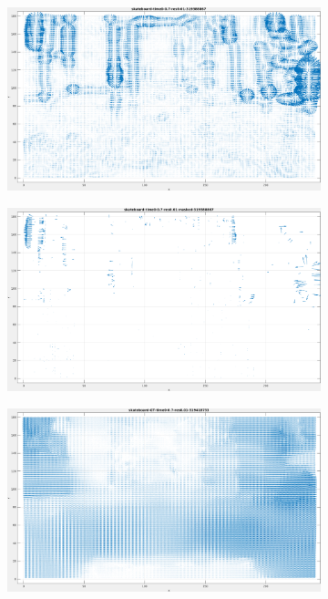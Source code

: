 \begin{figure}[tb]
\centering
\begin{subfigure}{.45\textwidth}
  \centering
  \includegraphics[height=.6\linewidth]{figs/skateboard/skateboard-1.png}
  \caption{}
  \label{fig:skateboard-snapshots1}
\end{subfigure}
\begin{subfigure}{.45\textwidth}
  \includegraphics[height=.6\linewidth]{figs/skateboard/skateboard-masked-1.png}
  \caption{}
\end{subfigure}
\begin{subfigure}{.45\textwidth}
  \centering
  \includegraphics[height=.6\linewidth]{figs/skateboard/skateboard-GT-1.png}

\end{subfigure}
\end{figure}
